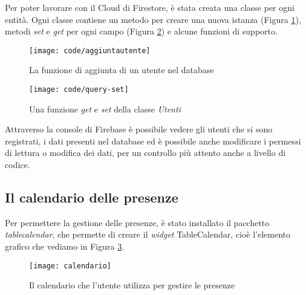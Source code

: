 Per poter lavorare con il Cloud di Firestore, è stata creata una classe per ogni entità.\newline
Ogni classe contiene un metodo per creare una nuova istanza (Figura \ref{fig:code-aggiungi}), metodi \emph{set} e \emph{get} per ogni campo (Figura \ref{fig:code-query}) e alcune funzioni di supporto.
\begin{figure}[!h] 
    \centering 
    \texttt{[image: code/aggiuntautente]} 
    \caption{La funzione di aggiunta di un utente nel database}
    \label{fig:code-aggiungi}
\end{figure}
\begin{figure}[!h] 
    \centering 
    \texttt{[image: code/query-set]} 
    \caption{Una funzione \emph{get} e \emph{set} della classe \emph{Utenti}}
    \label{fig:code-query}
\end{figure}

Attraverso la console di Firebase è possibile vedere gli utenti che si sono registrati, i dati presenti nel database ed è possibile anche modificare i permessi di lettura o modifica dei dati, per un controllo più attento anche a livello di codice. 

\newpage

\subsection{Il calendario delle presenze}
Per permettere la gestione delle presenze, è stato installato il pacchetto \emph{table\textunderscore calendar}, che permette di creare il \emph{widget} TableCalendar, cioè l'elemento grafico che vediamo in Figura \ref{fig:calendario}.
\begin{figure}[!h] 
    \centering 
    \texttt{[image: calendario]} 
    \caption{Il calendario che l'utente utilizza per gestire le presenze}
    \label{fig:calendario}
\end{figure}


